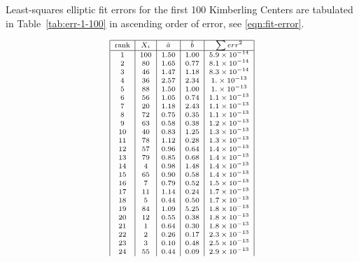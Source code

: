 Least-squares elliptic fit errors for the first 100 Kimberling Centers are tabulated in Table~\ref{tab:err-1-100} in ascending order of error, see \eqref{eqn:fit-error}. 

{
\begin{table}[!hb]
\begin{minipage}[t]{.4\linewidth}
\centering
\[ \scriptsize
\begin{array}{|c|c|c|c|c|}
\hline
 \text{rank} &  X_i & \hat{a} & \hat{b} & \sum{err{}^2} \\
 \hline
 1 & 100 & 1.50 & 1.00 & 5.9\times 10^{-14} \\
 2 & 80 & 1.65 & 0.77 & 8.1\times 10^{-14} \\
 3 & 46 & 1.47 & 1.18 & 8.3\times 10^{-14} \\
 4 & 36 & 2.57 & 2.34 & 1.\times 10^{-13} \\
 5 & 88 & 1.50 & 1.00 & 1.\times 10^{-13} \\
 6 & 56 & 1.05 & 0.74 & 1.1\times 10^{-13} \\
 7 & 20 & 1.18 & 2.43 & 1.1\times 10^{-13} \\
 8 & 72 & 0.75 & 0.35 & 1.1\times 10^{-13} \\
 9 & 63 & 0.58 & 0.38 & 1.2\times 10^{-13} \\
 10 & 40 & 0.83 & 1.25 & 1.3\times 10^{-13} \\
 11 & 78 & 1.12 & 0.28 & 1.3\times 10^{-13} \\
 12 & 57 & 0.96 & 0.64 & 1.4\times 10^{-13} \\
 13 & 79 & 0.85 & 0.68 & 1.4\times 10^{-13} \\
 14 & 4 & 0.98 & 1.48 & 1.4\times 10^{-13} \\
 15 & 65 & 0.90 & 0.58 & 1.4\times 10^{-13} \\
 16 & 7 & 0.79 & 0.52 & 1.5\times 10^{-13} \\
 17 & 11 & 1.14 & 0.24 & 1.7\times 10^{-13} \\
 18 & 5 & 0.44 & 0.50 & 1.7\times 10^{-13} \\
 19 & 84 & 1.09 & 5.25 & 1.8\times 10^{-13} \\
 20 & 12 & 0.55 & 0.38 & 1.8\times 10^{-13} \\
 21 & 1 & 0.64 & 0.30 & 1.8\times 10^{-13} \\
 22 & 2 & 0.26 & 0.17 & 2.3\times 10^{-13} \\
 23 & 3 & 0.10 & 0.48 & 2.5\times 10^{-13} \\
 24 & 55 & 0.44 & 0.09 & 2.9\times 10^{-13} \\

\end{array}\]
\end{minipage}
\end{table}}
